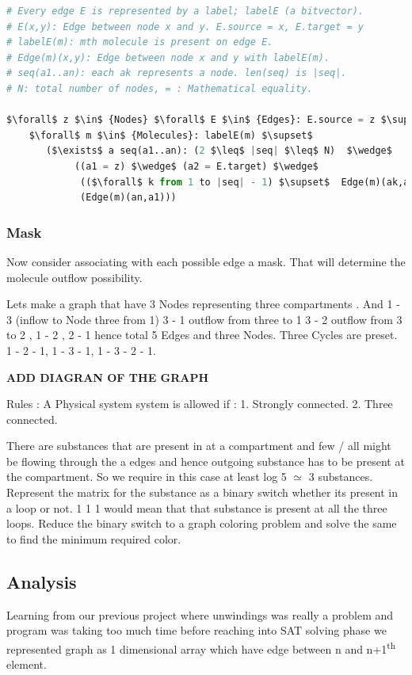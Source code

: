 \documentclass[preprint,12pt]{elsarticle}
\begin{document}
\begin{lstlisting}[language=Python,
mathescape,
 breaklines,
  rulecolor=\color{black},
  frame=single,
  caption= \textbf{Steady state specification.}
]
# Every edge E is represented by a label; labelE (a bitvector).
# E(x,y): Edge between node x and y. E.source = x, E.target = y    
# labelE(m): mth molecule is present on edge E.
# Edge(m)(x,y): Edge between node x and y with labelE(m).                 
# seq(a1..an): each ak represents a node. len(seq) is |seq|.
# N: total number of nodes, = : Mathematical equality.
 
$\forall$ z $\in$ {Nodes} $\forall$ E $\in$ {Edges}: E.source = z $\supset$
    $\forall$ m $\in$ {Molecules}: labelE(m) $\supset$
       ($\exists$ a seq(a1..an): (2 $\leq$ |seq| $\leq$ N)  $\wedge$
            ((a1 = z) $\wedge$ (a2 = E.target) $\wedge$
             (($\forall$ k from 1 to |seq| - 1) $\supset$  Edge(m)(ak,ak+1)) $\wedge$
             (Edge(m)(an,a1)))

\end{lstlisting}

\subsubsection{Mask}
Now consider associating with each possible edge a mask. That will determine the molecule outflow possibility.
 
Lets make a graph that have 3 Nodes representing three compartments . And 1 - 3 (inflow to Node three from 1) 3 - 1 {outflow from three to 1} 3 - 2 { outflow from 3 to 2} , 1 - 2 , 2 - 1 hence total 5 Edges and three Nodes. 
Three Cycles are preset. 1 - 2 - 1, 1 - 3 - 1, 1 - 3 - 2 - 1. 


\textbf{ADD DIAGRAN OF THE GRAPH}


Rules : A Physical system system is allowed if :
   1. Strongly connected. 
   2. Three connected.

There are substances that are present in at a compartment and few / all might be flowing through the a  edges and hence outgoing substance has to be present at the compartment. So we require in this case at least log 5 $\simeq$ 3 substances. 
Represent the matrix for the substance as a binary switch whether its present in a loop or not. 1 1 1 would mean that that substance is present at all the three loops. Reduce the binary switch to a graph coloring problem and solve the same to find the minimum required color. 

\subsection{Analysis}
Learning from our previous project where unwindings was really a problem and program was taking too much time before reaching into SAT solving phase we represented graph as 1 dimensional array which have edge between n and n+1\textsuperscript{th} element. 
\end{document}
